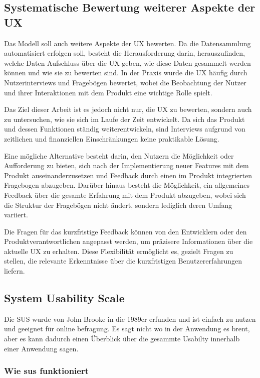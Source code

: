 \documentclass[12pt,oneside]{article}
\begin{document}
\subsection{Systematische Bewertung weiterer Aspekte der UX}
 Das Modell soll auch weitere Aspekte der UX bewerten. Da die Datensammlung automatisiert erfolgen soll, besteht die Herausforderung darin, herauszufinden, welche Daten Aufschluss über die UX geben, wie diese Daten gesammelt werden können und wie sie zu bewerten sind. In der Praxis wurde die UX häufig durch Nutzerinterviews und Fragebögen bewertet, wobei die Beobachtung der Nutzer und ihrer Interaktionen mit dem Produkt eine wichtige Rolle spielt.

Das Ziel dieser Arbeit ist es jedoch nicht nur, die UX zu bewerten, sondern auch zu untersuchen, wie sie sich im Laufe der Zeit entwickelt. Da sich das Produkt und dessen Funktionen ständig weiterentwickeln, sind Interviews aufgrund von zeitlichen und finanziellen Einschränkungen keine praktikable Lösung.

Eine mögliche Alternative besteht darin, den Nutzern die Möglichkeit oder Aufforderung zu bieten, sich nach der Implementierung neuer Features mit dem Produkt auseinanderzusetzen und Feedback durch einen im Produkt integrierten Fragebogen abzugeben. Darüber hinaus besteht die Möglichkeit, ein allgemeines Feedback über die gesamte Erfahrung mit dem Produkt abzugeben, wobei sich die Struktur der Fragebögen nicht ändert, sondern lediglich deren Umfang variiert.

Die Fragen für das kurzfristige Feedback können von den Entwicklern oder den Produktverantwortlichen angepasst werden, um präzisere Informationen über die aktuelle UX zu erhalten. Diese Flexibilität ermöglicht es, gezielt Fragen zu stellen, die relevante Erkenntnisse über die kurzfristigen Benutzererfahrungen liefern.
 

\subsection{System Usability Scale}
Die SUS wurde von John Brooke in die 1989er erfunden und ist einfach zu nutzen und geeignet für online befragung.
Es sagt nicht wo in der Anwendung es brent, aber es kann dadurch einen Überblick über die gesammte Usabilty innerhalb einer Anwendung sagen.
\subsubsection{Wie sus funktioniert}
\end{document}
